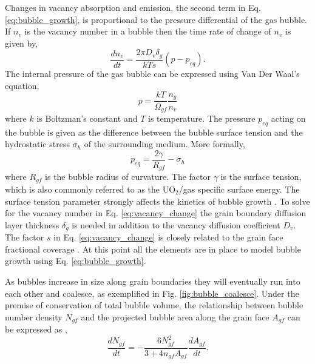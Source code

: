 Changes in vacancy absorption and emission, the second term in Eq. \ref{eq:bubble_growth}, is proportional to the pressure differential of the gas bubble. If $n_v$ is the vacancy number in a bubble then the time rate of change of $n_v$ is given by,
\begin{equation}
\label{eq:vacancy_change}
 \frac{dn_v}{dt} = \frac{2\pi D_v \delta_g}{kTs}\left(p - p_{eq}\right).
\end{equation}    
The internal pressure of the gas bubble can be expressed using Van Der Waal's equation,
\begin{equation}
\label{eq:interal_gas_pressure}
 p = \frac{kT}{\Omega_{gf}} \frac{n_g}{n_v}
\end{equation}
where $k$ is Boltzman's constant and $T$ is temperature. The pressure $p_{eq}$ acting on the bubble is given as the difference between the bubble surface tension and the hydrostatic stress $\sigma_h$ of the surrounding medium. More formally,
\begin{equation}
\label{eq:external_gas_pressure}
 p_{eq} = \frac{2\gamma}{R_{gf}} - \sigma_h
\end{equation} 
where $R_{gf}$ is the bubble radius of curvature. The factor $\gamma$ is the surface tension, which is also commonly referred to as the UO$_2$/gas specific surface energy. The surface tension parameter strongly affects the kinetics of bubble growth \cite{Swiler3}. To solve for the vacancy number in Eq. \ref{eq:vacancy_change} the grain boundary diffusion layer thickness $\delta_g$ is needed in addition to the vacancy diffusion coefficient $D_v$. The factor $s$ in Eq. \ref{eq:vacancy_change} is closely related to the grain face fractional coverage \cite{Pastore1}. At this point all the elements are in place to model bubble growth using Eq. \ref{eq:bubble_growth}.  

As bubbles increase in size along grain boundaries they will eventually run into each other and coalesce, as exemplified in Fig. \ref{fig:bubble_coalesce}. Under the premise of conservation of total bubble volume, the relationship between bubble number density $N_{gf}$ and the projected bubble area along the grain face $A_{gf}$ can be expressed as \cite{Pastore3},
\begin{equation}
\label{eq:bubble_coalesecence}
 \frac{dN_{gf}}{dt} = -\frac{6N_{gf}^2}{3+4n_{gf}A_{gf}} \frac{dA_{gf}}{dt}.
\end{equation}

